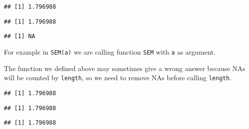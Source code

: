 \documentclass[paper=a4,10pt,div=17,headsepline,BCOR=12mm,twoside,open=right]{scrbook}\usepackage{knitr}
\begin{document}
\begin{knitrout}\footnotesize
{}\color{fgcolor}\begin{kframe}
\begin{alltt}
 \hlkwb{<-} \hlstd{(}\hlstd{)\{}\hlstd{(}\hlopt{/}
 \hlkwb{<-} \hlstd{(}\hlstd{,} \hlstd{,} \hlstd{,} \hlopt{-}\hlstd{)}
 \hlkwb{<-}  \hlstd{)}
\hlstd{(}
\end{alltt}
\begin{verbatim}
## [1] 1.796988
\end{verbatim}
\begin{alltt}
\end{alltt}
\begin{verbatim}
## [1] 1.796988
\end{verbatim}
\begin{alltt}
\end{alltt}
\begin{verbatim}
## [1] NA
\end{verbatim}
\end{kframe}
\end{knitrout}

For example in \texttt{SEM(a)} we are calling function \texttt{SEM} with \texttt{a} as argument.

The function we defined above may sometimes give a wrong answer because NAs will be counted by \texttt{length}, so we need to remove NAs before calling \texttt{length}.

\begin{knitrout}\footnotesize
{}\color{fgcolor}\begin{kframe}
\begin{alltt}
 \hlkwb{<-} \hlstd{(}\hlstd{)} \hlstd{(} \hlstd{=}\hlstd{)}\hlopt{/}\hlstd{(}
 \hlkwb{<-} \hlstd{(}\hlstd{,} \hlstd{,} \hlstd{,} \hlopt{-}\hlstd{)}
 \hlkwb{<-}  \hlstd{)}
\hlstd{(}
\end{alltt}
\begin{verbatim}
## [1] 1.796988
\end{verbatim}
\begin{alltt}
\end{alltt}
\begin{verbatim}
## [1] 1.796988
\end{verbatim}
\begin{alltt}
\end{alltt}
\begin{verbatim}
## [1] 1.796988
\end{verbatim}
\end{kframe}
\end{knitrout}
\end{document}

